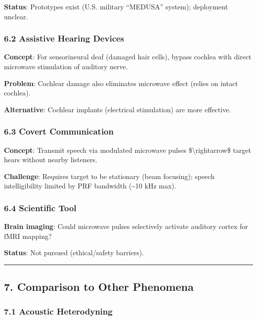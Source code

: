 \textbf{Status}: Prototypes exist (U.S. military ``MEDUSA'' system);
deployment unclear.

\subsubsection{6.2 Assistive Hearing
Devices}\label{assistive-hearing-devices}

\textbf{Concept}: For sensorineural deaf (damaged hair cells), bypass
cochlea with direct microwave stimulation of auditory nerve.

\textbf{Problem}: Cochlear damage also eliminates microwave effect
(relies on intact cochlea).

\textbf{Alternative}: Cochlear implants (electrical stimulation) are
more effective.

\subsubsection{6.3 Covert Communication}\label{covert-communication}

\textbf{Concept}: Transmit speech via modulated microwave pulses
\$\textbackslash rightarrow\$ target hears without nearby listeners.

\textbf{Challenge}: Requires target to be stationary (beam focusing);
speech intelligibility limited by PRF bandwidth (\textasciitilde10 kHz
max).

\subsubsection{6.4 Scientific Tool}\label{scientific-tool}

\textbf{Brain imaging}: Could microwave pulses selectively activate
auditory cortex for fMRI mapping?

\textbf{Status}: Not pursued (ethical/safety barriers).

\begin{center}\rule{0.5\linewidth}{0.5pt}\end{center}

\subsection{7. Comparison to Other
Phenomena}\label{comparison-to-other-phenomena}

\subsubsection{7.1 Acoustic Heterodyning}\label{acoustic-heterodyning}

